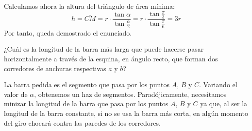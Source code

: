 \begin{ejercicio}
    Calculamos ahora la altura del triángulo de área mínima:
    \begin{equation*}
        h=\overline{CM} = r\cdot \frac{\tan \alpha}{\tan \frac{\alpha}{2}} =r\cdot \frac{\tan \frac{\pi}{3}}{\tan \frac{\pi}{6}} = 3r
    \end{equation*}
    Por tanto, queda demostrado el enunciado.    
\end{ejercicio}

\begin{ejercicio}
    ¿Cuál es la longitud de la barra más larga que puede hacerse pasar horizontalmente a través de la esquina, en ángulo recto, que forman dos corredores de anchuras respectivas $a$ y $b$?
    \begin{figure}[H]
        \centering
    \end{figure}

    La barra pedida es el segmento que pasa por los puntos $A$, $B$ y $C$. Variando el valor de $\alpha$, obtenemos un haz de segmentos. Paradójicamente, necesitamos minizar la longitud de la barra que pasa por los puntos $A$, $B$ y $C$ ya que, al ser la longitud de la barra constante, si no se usa la barra más corta, en algún momento del giro chocará contra las paredes de los corredores.


\end{ejercicio}
